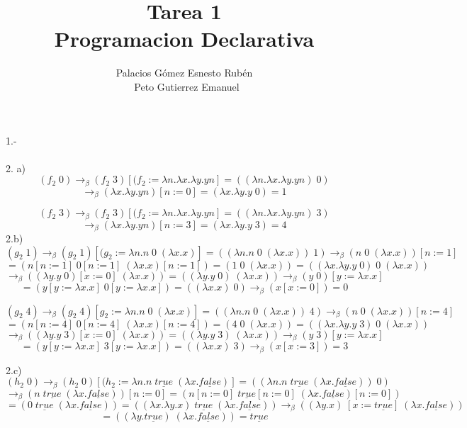 \documentclass{article}
\title{Tarea 1 \\ Programacion Declarativa}
\author{Palacios Gómez Esnesto Rubén \\ \ Peto Gutierrez Emanuel}
\begin{document}
	\maketitle
	\begin{flushleft}
	1.-  \\ \ \\

	2. a)
	\[(f_{2} \;0) \rightarrow_{\beta} (f_{2} \;3) [(f_{2} := \lambda n.\lambda x.\lambda y. y n]  =( (\lambda n.\lambda x.\lambda y. y n) \;0 )\]
	\[ \rightarrow_{\beta}(\lambda x.\lambda y. y n)[n := 0] = (\lambda x.\lambda y. y \;0) = 1\]

	\[(f_{2} \;3) \rightarrow_{\beta} (f_{2} \;3) [(f_{2} := \lambda n.\lambda x.\lambda y. y n] = ( (\lambda n.\lambda x.\lambda y. y n) \;3)\]
	\[ \rightarrow_{\beta}(\lambda x.\lambda y. y n)[n := 3] = (\lambda x.\lambda y. y \;3) = 4\]
	2.b)
	\[(g_{2} \;1) \rightarrow_{\beta} (g_{2} \;1) [(g_{2} := \lambda n.n \;0 \;(\lambda x.x)]  =( ( \lambda n.n \;0 \;(\lambda x.x)) \;1) \rightarrow_{\beta} (n \;0 \;(\lambda x.x))[n:=1] \]
	\[ = (n[n := 1]\; 0 [n := 1]  \;  (\lambda x.x) [n := 1]) = (1\;0\;(\lambda x.x)) =( ( \lambda x.\lambda y. y \; 0)\; 0  \; (\lambda x.x))\]
	\[ \rightarrow_{\beta}( ( \lambda y. y \; 0)[x:= 0]  \; (\lambda x.x)) = ( ( \lambda y. y \; 0)\; (\lambda x.x))  \rightarrow_{\beta} (y \; 0) [y:=\lambda x.x] \]
	\[= (y[y:=\lambda x.x] \; 0[y:=\lambda x.x])  = ( (\lambda x.x) \;0)  \rightarrow_{\beta} (x [x := 0] ) = 0\]
	
	\[(g_{2} \;4) \rightarrow_{\beta} (g_{2} \;4) [g_{2} := \lambda n.n \;0 \;(\lambda x.x)]  =( ( \lambda n.n \;0 \;(\lambda x.x)) \;4) \rightarrow_{\beta} (n \;0 \;(\lambda x.x))[n:=4] \]
	\[ = (n[n := 4]\; 0 [n := 4]  \;  (\lambda x.x) [n := 4]) = (4\;0\;(\lambda x.x)) =( ( \lambda x.\lambda y. y \; 3)\; 0  \; (\lambda x.x))\]
	\[ \rightarrow_{\beta}( ( \lambda y. y \; 3)[x:= 0]  \; (\lambda x.x)) = ( ( \lambda y. y \; 3)\; (\lambda x.x))  \rightarrow_{\beta} (y \; 3) [y:=\lambda x.x] \]
	\[= (y[y:=\lambda x.x] \; 3[y:=\lambda x.x])  = ( (\lambda x.x) \;3)  \rightarrow_{\beta} (x [x := 3] ) = 3\]
	
	2.c)
	\[(h_{2} \;0) \rightarrow_{\beta} (h_{2} \;0) [(h_{2} := \lambda n.n  \; \underline {true} \;(\lambda x.  \underline {false})]  =( ( \lambda n.n  \; \underline {true} \;(\lambda x.  \underline 		{false})) \;0 )\]
	\[ \rightarrow_{\beta}(n  \; \underline {true} \;(\lambda x.  \underline {false}))[n := 0] = (n[n := 0]   \; \underline {true}[n := 0]  \;(\lambda x.  \underline {false})[n := 0] )\]
	\[ = (0  \; \underline {true} \;(\lambda x.  \underline {false})) =( (\lambda x.\lambda y. x)\; \underline {true}  \;(\lambda x.  \underline {false}))  \rightarrow_{\beta} ( (\lambda y. x)\; [x:= 		\underline {true} ] \;(\lambda x.  \underline {false})) \]
	\[=((\lambda y.\underline {true})\; (\lambda x.  \underline {false})) = \underline {true}  \]


\end{flushleft}
\end{document}
